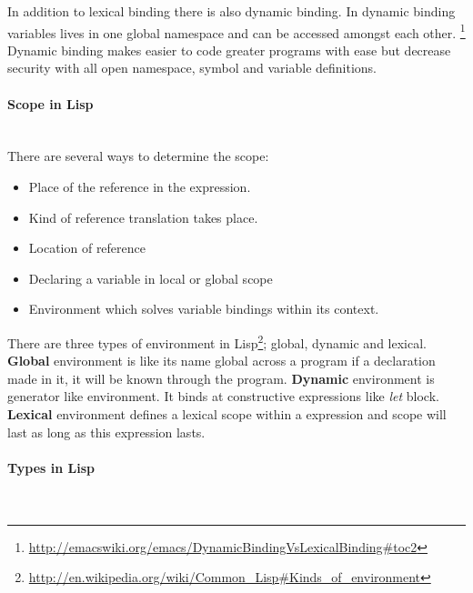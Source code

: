 \documentclass[11pt]{article}
\begin{document}
In addition to lexical binding there is also dynamic binding. In dynamic binding variables lives in one global namespace and can be accessed amongst each other. \footnote{\url{http://emacswiki.org/emacs/DynamicBindingVsLexicalBinding\#toc2}} Dynamic binding makes easier to code greater programs with ease but decrease security with all open namespace, symbol and variable definitions.

\paragraph{Scope in Lisp} ~\\

There are several ways to determine the scope:
\begin{itemize}
\item
Place of the reference in the expression.
\item
Kind of reference translation takes place.
\item
Location of reference
\item
Declaring a variable in local or global scope
\item
Environment which solves variable bindings within its context.
\end{itemize}
There are three types of environment in Lisp\footnote{\url{http://en.wikipedia.org/wiki/Common_Lisp\#Kinds_of_environment}}; global, dynamic and lexical.
\textbf{Global} environment is like its name global across a program if a declaration made in it, it will be known through the program.
\textbf{Dynamic} environment is generator like environment. It binds at constructive expressions like \textit{let} block.
\textbf{Lexical} environment defines a lexical scope within a expression and scope will last as long as this expression lasts.

\paragraph{Types in Lisp} ~\\
\end{document}
